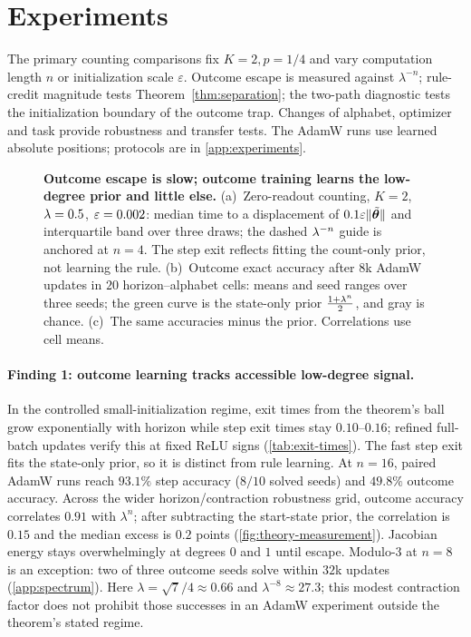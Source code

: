 \section{Experiments}
\label{sec:experiments}
\label{sec:validation}

The primary counting comparisons fix $K=2,p=1/4$ and vary computation length
$n$ or initialization scale $\varepsilon$. Outcome escape is measured against
$\lambda^{-n}$; rule-credit magnitude tests Theorem~\ref{thm:separation};
the two-path diagnostic tests the initialization boundary of the outcome trap.
Changes of alphabet, optimizer and task provide robustness and transfer tests. The AdamW runs use
learned absolute positions; protocols are in \cref{app:experiments}.

\begin{figure}[t]
\centering
\resizebox{\linewidth}{!}{}
\caption{\textbf{Outcome escape is slow; outcome training learns the low-degree prior and little else.}
(a)~Zero-readout counting, $K=2$, $\lambda=0.5$, $\varepsilon=0.002$: median time to a displacement of $0.1\varepsilon\|\tilde{\bm\theta}\|$ and interquartile band over three draws; the dashed $\lambda^{-n}$ guide is anchored at $n=4$. The step exit reflects fitting the count-only prior, not learning the rule.
(b)~Outcome exact accuracy after $8$k AdamW updates in $20$ horizon--alphabet cells: means and seed ranges over three seeds; the green curve is the state-only prior $\frac{1+\lambda^n}{2}$, and gray is chance.
(c)~The same accuracies minus the prior. Correlations use cell means.}
\label{fig:theory-measurement}
\label{fig:lambda-grid}
\end{figure}

\paragraph{Finding 1: outcome learning tracks accessible low-degree signal.}
In the controlled small-initialization regime, exit times from the theorem's ball grow
exponentially with horizon while step exit times stay $0.10$--$0.16$; refined full-batch
updates verify this at fixed ReLU signs (\cref{tab:exit-times}). The fast step exit fits
the state-only prior, so it is distinct from rule learning. At $n=16$, paired AdamW runs
reach $93.1\%$ step accuracy ($8/10$ solved seeds) and $49.8\%$ outcome accuracy.
Across the wider horizon/contraction robustness grid, outcome accuracy correlates $0.91$ with $\lambda^n$;
after subtracting the start-state prior, the correlation is $0.15$ and the median excess
is $0.2$ points (\cref{fig:theory-measurement}). Jacobian energy stays overwhelmingly at
degrees $0$ and $1$ until escape. Modulo-$3$ at $n=8$ is an exception: two of three
outcome seeds solve within $32$k updates (\cref{app:spectrum}). Here
$\lambda=\sqrt7/4\approx0.66$ and $\lambda^{-8}\approx27.3$; this modest contraction
factor does not prohibit those successes in an AdamW experiment outside the theorem's stated regime.

